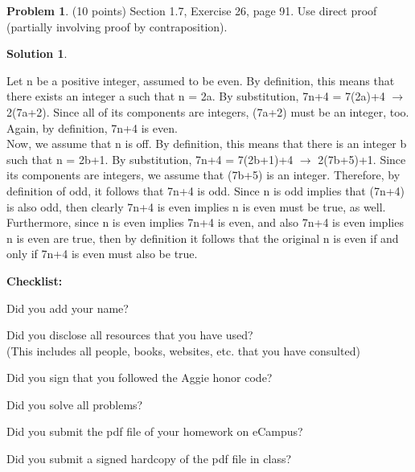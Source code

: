 \documentclass{article}
\theoremstyle{definition}
\newtheorem{problem}{Problem}
\newtheorem*{solution}{Solution}
\newcommand{\nix}[1]{}  %
\newcommand{\checklist}{\noindent\textbf{Checklist:}
\begin{compactitem}[$\Box$] 
\item Did you add your name? 
\item Did you disclose all resources that you have used? \\
(This includes all people, books, websites, etc. that you have consulted)
\item Did you sign that you followed the Aggie honor code? 
\item Did you solve all problems? 
\item Did you submit the pdf file of your homework on eCampus?
\item Did you submit a signed hardcopy of the pdf file in class? 
\end{compactitem}
}
\newcommand{\N}{\mathbf{N}}
\newcommand{\R}{\mathbf{R}}
\begin{document}
\begin{problem} (10 points)
Section 1.7, Exercise 26, page 91.  Use direct proof (partially involving proof by contraposition).
\end{problem}
\begin{solution}
\end{solution}		\noindent Let n be a positive integer, assumed to be even. By definition, this means that 					there exists an integer a such that n = 2a. By substitution, 7n+4 = 7(2a)+4 $\rightarrow$ 					2(7a+2). Since all of its components are integers, (7a+2) must be an integer, too. Again, by 				definition, 7n+4 is even. \\
				Now, we assume that n is off. By definition, this means that there is an integer b such that n 				= 2b+1. By substitution, 7n+4 = 7(2b+1)+4 $\rightarrow$ 2(7b+5)+1. Since its components 				are integers, we assume that (7b+5) is an integer. Therefore, by definition of odd, it follows 				that 7n+4 is odd. Since n is odd implies that (7n+4) is also odd, then clearly 7n+4 is even 					implies n is even must be true, as well. \\
				Furthermore, since n is even implies 7n+4 is even, and also 7n+4 is even implies n is even 				are true, then by definition it follows that the original n is even if and only if 7n+4 is even 					must also be true. 


\nix{
\begin{problem}  (10 points)
Let $f_1, f_2, f_3, f_4$ be functions from the set $\N$ of natural numbers
to the set $\R$ of real numbers. Suppose that $f_1= O(f_2)$ and
$f_3=O(f_4)$. Use the definition of Big Oh \textit{given in class} to prove that 
$$f_1(n) + f_3(n) = O(\max(f_2(n),  f_4(n))).$$
\end{problem}
\begin{solution}
\end{solution}

\begin{problem} (4 pts $\times$ 5 = 20 points) Determine which of the following
  statements are correct:
\begin{compactenum}[(a)]
\item $ 2n^2-n = O(n^2)$
\item $ n^2 = O(n\log n)$
\item $ n^2 = O(n^3)$
\item $ n = \Omega(n^2)$
\item $ 1= \Omega(1/n)$
\end{compactenum}
In each case, answer correct or incorrect, and justify your answer. 
\end{problem}
\begin{solution}
\end{solution}
}%

\goodbreak
\checklist
\end{document}
